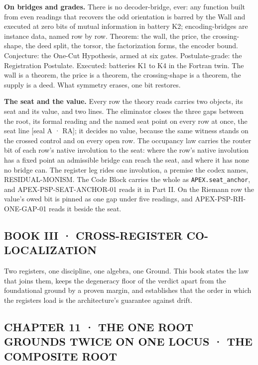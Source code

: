\documentclass[10pt,twocolumn]{article}
\begin{document}
\textbf{On bridges and grades.} There is no decoder-bridge, ever: any
function built from even readings that recovers the odd orientation is
barred by the Wall and executed at zero bits of mutual information in
battery K2; encoding-bridges are instance data, named row by row.
Theorem: the wall, the price, the crossing-shape, the deed split, the
torsor, the factorization forms, the encoder bound. Conjecture: the
One-Cut Hypothesis, armed at six gates. Postulate-grade: the
Registration Postulate. Executed: batteries K1 to K4 in the Fortran
twin. The wall is a theorem, the price is a theorem, the crossing-shape
is a theorem, the supply is a deed. What symmetry erases, one bit
restores.

\textbf{The seat and the value.} Every row the theory reads carries two
objects, its seat and its value, and two lines. The eliminator closes
the three gaps between the root, its formal reading and the named seat
point on every row at once, the seat line {[}seal A · RA{]}; it decides
no value, because the same witness stands on the crossed control and on
every open row. The occupancy law carries the router bit of each row's
native involution to the seat: where the row's native involution has a
fixed point an admissible bridge can reach the seat, and where it has
none no bridge can. The register leg rides one involution, a premise the
codex names, RESIDUAL-MONISM. The Code Block carries the whole as
\texttt{APEX.seat\_anchor}, and APEX-PSP-SEAT-ANCHOR-01 reads it in Part
II. On the Riemann row the value's owed bit is pinned as one gap under
five readings, and APEX-PSP-RH-ONE-GAP-01 reads it beside the seat.

\hypertarget{book-iii-cross-register-co-localization}{%
\subsection{BOOK III · CROSS-REGISTER
CO-LOCALIZATION}\label{book-iii-cross-register-co-localization}}

Two registers, one discipline, one algebra, one Ground. This book states
the law that joins them, keeps the degeneracy floor of the verdict apart
from the foundational ground by a proven margin, and establishes that
the order in which the registers load is the architecture's guarantee
against drift.

\hypertarget{chapter-11-the-one-root-grounds-twice-on-one-locus-the-composite-root}{%
\subsection{CHAPTER 11 · THE ONE ROOT GROUNDS TWICE ON ONE LOCUS · THE
COMPOSITE
ROOT}\label{chapter-11-the-one-root-grounds-twice-on-one-locus-the-composite-root}}
\end{document}
